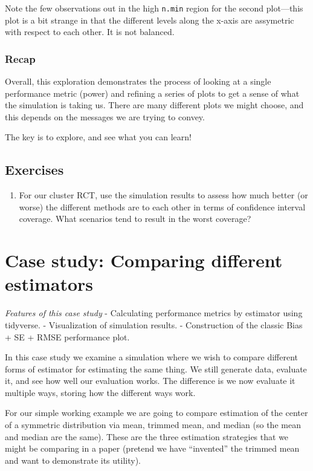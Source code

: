 \documentclass[
]{book}
\providecommand{\tightlist}{%
  \setlength{\itemsep}{0pt}\setlength{\parskip}{0pt}}
\begin{document}
Note the few observations out in the high \texttt{n.min} region for the second
plot---this plot is a bit strange in that the different levels along the
x-axis are assymetric with respect to each other. It is not balanced.

\subsection{Recap}\label{recap}

Overall, this exploration demonstrates the process of looking at a single performance metric (power) and refining a series of plots to get a sense of what the simulation is taking us.
There are many different plots we might choose, and this depends on the messages we are trying to convey.

The key is to explore, and see what you can learn!

\section{Exercises}\label{exercises-7}

\begin{enumerate}
\def\labelenumi{\arabic{enumi})}
\tightlist
\item
  For our cluster RCT, use the simulation results to assess how much better (or worse) the different methods are to each other in terms of confidence interval coverage. What scenarios tend to result in the worst coverage?
\end{enumerate}

\chapter{Case study: Comparing different estimators}\label{case-study-comparing-different-estimators}

\emph{Features of this case study}
- Calculating performance metrics by estimator using tidyverse.
- Visualization of simulation results.
- Construction of the classic Bias + SE + RMSE performance plot.

In this case study we examine a simulation where we wish to compare different forms of
estimator for estimating the same thing. We still generate data, evaluate it,
and see how well our evaluation works. The difference is we now evaluate it
multiple ways, storing how the different ways work.

For our simple working example we are going to compare estimation of the
center of a symmetric distribution via mean, trimmed mean, and median (so the
mean and median are the same). These are the three estimation strategies
that we might be comparing in a paper (pretend we have ``invented'' the trimmed
mean and want to demonstrate its utility).
\end{document}

